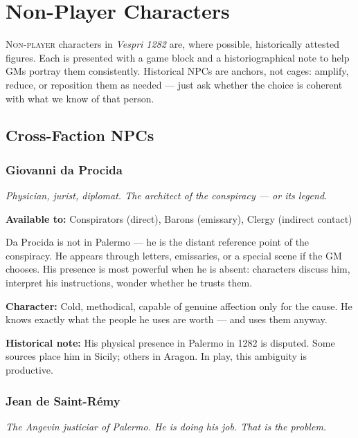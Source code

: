 
\chapter{Non-Player Characters}

\lettrine[lines=3]{N}{on-player} characters in \textit{Vespri 1282} are,
where possible, historically attested figures. Each is presented with
a game block and a historiographical note to help GMs portray them
consistently. Historical NPCs are anchors, not cages: amplify, reduce,
or reposition them as needed --- just ask whether the choice is coherent
with what we know of that person.

\secsep

\section{Cross-Faction NPCs}

\subsection{Giovanni da Procida}
\textit{Physician, jurist, diplomat. The architect of the conspiracy — or its legend.}


\textbf{Available to:} Conspirators (direct), Barons (emissary),
Clergy (indirect contact)

Da Procida is not in Palermo --- he is the distant reference point
of the conspiracy. He appears through letters, emissaries, or a special
scene if the GM chooses. His presence is most powerful when he is absent:
characters discuss him, interpret his instructions, wonder whether he
trusts them.

\textbf{Character:} Cold, methodical, capable of genuine affection only
for the cause. He knows exactly what the people he uses are worth ---
and uses them anyway.

\textbf{Historical note:} His physical presence in Palermo in 1282 is
disputed. Some sources place him in Sicily; others in Aragon. In play,
this ambiguity is productive.

\filetto

\subsection{Jean de Saint-Rémy}
\textit{The Angevin justiciar of Palermo. He is doing his job. That is the problem.}

